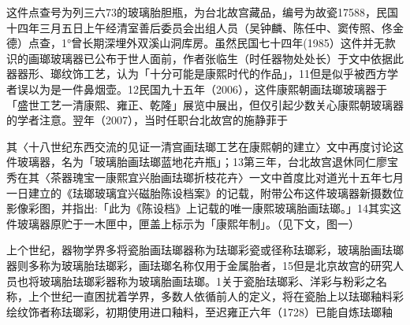 这件点查号为列三六73的玻璃胎胆瓶，为台北故宫藏品，编号为故瓷17588，民国十四年三月五日上午经清室善后委员会出组人员（吴钟麟、陈任中、窦传照、佟金德）点查，1°曾长期深埋外双溪山洞库房。虽然民国七十四年(1985）这件并无款识的画瑯玻璃器已公布于世人面前，作者张临生（时任器物处处长）于文中依据此器器形、瑯纹饰工艺，认为「十分可能是康熙时代的作品」，11但是似乎被西方学者误以为是一件鼻烟壶。12民国九十五年（2006），这件康熙朝画珐瑯玻璃器于「盛世工艺一清康熙、雍正、乾隆」展览中展出，但仅引起少数关心康熙朝玻璃器的学者注意。翌年（2007），当时任职台北故宫的施静菲于

\vfill
\begin{BookNotes}
\end{BookNotes}

\noindent 其〈十八世纪东西交流的见证一清宫画珐瑯工艺在康熙朝的建立〉文中再度讨论这件玻璃器，名为「玻璃胎画珐瑯蓝地花卉瓶」；13第三年，台北故宫退休同仁廖宝秀在其〈茶器瑰宝一康熙宜兴胎画珐瑯折枝花卉〉一文中首度比对道光十五年七月一日建立的《珐瑯玻璃宜兴磁胎陈设档案》的记载，附带公布这件玻璃器新摄数位影像彩图，并指出:「此为《陈设档》上记载的唯一康熙玻璃胎画珐瑯。」14其实这件玻璃器原贮于一木匣中，匣盖上标示为「康熙年制」。（见下文，图一）


上个世纪，器物学界多将瓷胎画珐瑯器称为珐瑯彩瓷或径称珐瑯彩，玻璃胎画珐瑯器则多称为玻璃胎珐瑯彩，画珐瑯名称仅用于金属胎者，15但是北京故宫的研究人员也将玻璃胎珐瑯彩器称为玻璃胎画珐瑯。1关于瓷胎珐瑯彩、洋彩与粉彩之名称，上个世纪一直困扰着学界，多数人依循前人的定义，将在瓷胎上以珐瑯釉料彩绘纹饰者称珐瑯彩，初期使用进口釉料，至迟雍正六年（1728）已能自炼珐瑯釉

